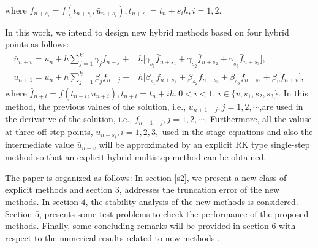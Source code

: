 ‎\documentclass[a4paper,10pt]{article}‎
\begin{document}
where
$ \bar{f}_{n+s_{i}}=f(t_{n+s_{i}},\bar{u}_{n+s_{i}}), t_{n+s_{i}}=t_{n}+s_{i} h, i=1,2.$
\par\noindent
In this work, we intend to design new hybrid methods based on four hybrid points as follows:
    \begin{align}
 \bar{u}_{n+v}=u_{n}+h\sum_{j=1}^{k'}\gamma_{j}f_{n-j}+ &  h\bigg[\gamma_{s_{1}}\bar{f}_{n+s_{1}}+\gamma_{s_{2}}\bar{f}_{n+s_{2}}+\gamma_{s_{3}}\bar{f}_{n+s_{3}}\bigg], \label{2.2}\\
u_{n+1}=u_{n}+h\sum_{j=1}^{k}\beta_{j}f_{n-j}+ &  h\bigg[\beta_{s_{1}}\bar{f}_{n+s_{1}}+\beta_{s_{2}}\bar{f}_{n+s_{2}}+\beta_{s_{3}}\bar{f}_{n+s_{3}}+\beta_{v}\bar{f}_{n+v}\bigg], \label{2.3}
\end{align}
where
 $ \bar{f}_{n+i}=f(t_{n+i},\bar{u}_{n+i}), t_{n+i}=t_{n}+i h, 0<i<1,\,i\in \{ v, s_{1}, s_{2}, s_{3}\}.$
 In this method,  the previous values ​​of the solution, i.e., $u_{n+1-j}, j=1,2,\cdots$,  ​​are used in the derivative of the solution, i.e., $f_{n+1-j}, j=1, 2,\cdots$. Furthermore,  all the valuse at three off-step points, $\bar{u}_{n+s_{i}},i=1, 2, 3,$ used ​​in the  stage equations  and  also the intermediate value $\bar{u}_{n+v}$ will be approximated by an explicit RK type single-step method so that an explicit hybrid multistep method can be obtained.

\noindent
The paper is organized as follows: In section \ref{s2}, we present a new class of explicit methods and section $3$,  addresses the truncation error of the new methods.
In section $4$,  the stability analysis of the new methods  is considered.
Section $5$,  presents some test problems to check the performance of the proposed methods.
    Finally, some concluding remarks will be provided in section $6$ with respect to the numerical results related to new methods  .
    
\end{document}
